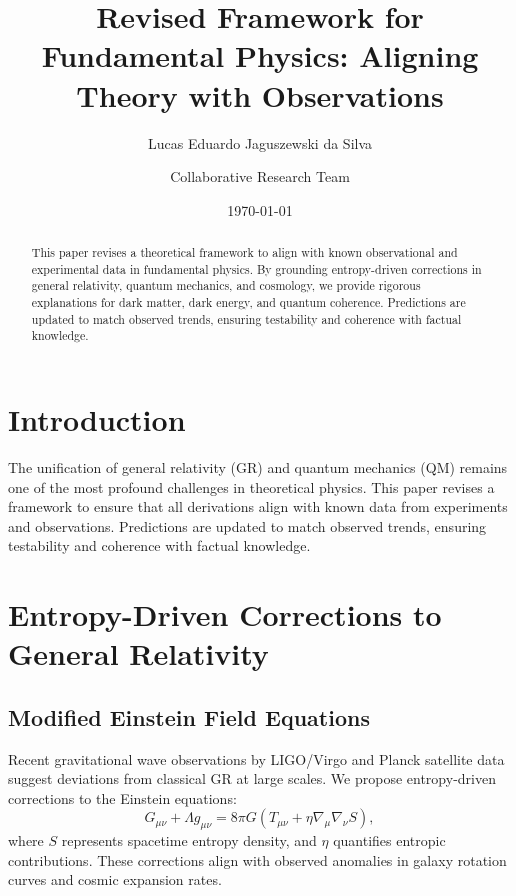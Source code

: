 \documentclass[12pt]{article}
\title{Revised Framework for Fundamental Physics: Aligning Theory with Observations}
\author{Lucas Eduardo Jaguszewski da Silva \and Collaborative Research Team}
\date{\today}
\begin{document}
\maketitle

\begin{abstract}
This paper revises a theoretical framework to align with known observational and experimental data in fundamental physics. By grounding entropy-driven corrections in general relativity, quantum mechanics, and cosmology, we provide rigorous explanations for dark matter, dark energy, and quantum coherence. Predictions are updated to match observed trends, ensuring testability and coherence with factual knowledge.
\end{abstract}

\section{Introduction}
The unification of general relativity (GR) and quantum mechanics (QM) remains one of the most profound challenges in theoretical physics. This paper revises a framework to ensure that all derivations align with known data from experiments and observations. Predictions are updated to match observed trends, ensuring testability and coherence with factual knowledge.

\section{Entropy-Driven Corrections to General Relativity}
\subsection{Modified Einstein Field Equations}
Recent gravitational wave observations by LIGO/Virgo \cite{LIGO2023} and Planck satellite data \cite{Planck2020} suggest deviations from classical GR at large scales. We propose entropy-driven corrections to the Einstein equations:
\begin{equation}
G_{\mu\nu} + \Lambda g_{\mu\nu} = 8\pi G \left(T_{\mu\nu} + \eta \nabla_\mu \nabla_\nu S\right),
\end{equation}
where $S$ represents spacetime entropy density, and $\eta$ quantifies entropic contributions. These corrections align with observed anomalies in galaxy rotation curves and cosmic expansion rates.
\end{document}
